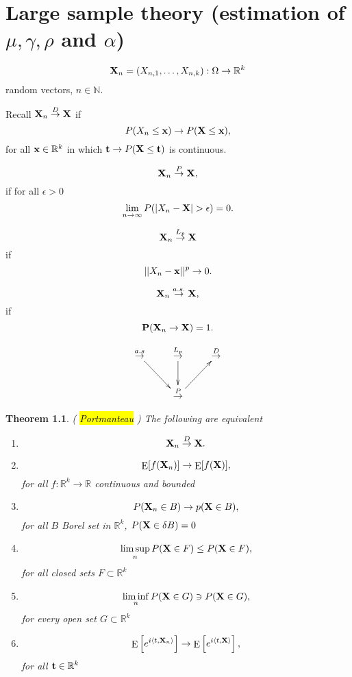 \documentclass[12pt,a4paper, notitlepage]{book}
\newcommand{\hlc}[2][yellow]{ {\sethlcolor{#1} \hl{#2}} }
\theoremstyle{definition} %
\theoremstyle{plain} %
\newtheorem{theorem}[definition]{Theorem}
\newcommand{\R}{\mathbb R}
\newcommand{\N}{\mathbb N}
\DeclareMathOperator{\E}{E}
\newcommand{\Important}[1]{ {\it \hlc{#1} } }
\begin{document}
\chapter{Large sample theory (estimation of $\mu, \gamma, \rho$ and $ \alpha$)}



\[ {\bf X} _n = (X_{n, 1}, \dots, X_{n,k}) : \Omega \rightarrow \R^k \]
 random vectors, $n \in \N . $

Recall ${\bf X}_n \overset{D}{\rightarrow}  {\bf X}$ if 
\[ P(X_n \leq {\bf x}) \rightarrow P({\bf X} \leq {\bf x}) , \]
 for all ${\bf x} \in \R^k$ in which ${\bf t} \rightarrow P({\bf X} \leq {\bf t})$ is continuous. 

\[ {\bf X}_n \overset{P}{\rightarrow}  {\bf X} , \]
 if for all $\epsilon > 0$ 
\[  \lim_{n \rightarrow \infty} P(|X_n - {\bf X}| > \epsilon) = 0. \]
 
\[ {\bf X}_n \overset{L_p}{\rightarrow} {\bf X} \]
if 
\[ ||X_n - {\bf x}||^p \rightarrow 0 . \]

\[ {\bf X}_n  \overset{a.s.}{\rightarrow} {\bf X} , \]
 if 
\[ {\bf P}({\bf X}_n \rightarrow {\bf X}) = 1 . \]

\begin{displaymath}
 \xymatrix{
  \overset{a.s}{\to} \ar[dr]   & \overset{ L_p}{\to} \ar[d] & \overset{D}{\to}  \\
 & \overset{P}{\to} \ar[ur]  &  }
\end{displaymath}


\begin{theorem} (\Important{Portmanteau})
The following are equivalent
\begin{enumerate}
\item \[ {\bf X}_n \overset{D}{\rightarrow} {\bf X} .\] 
\item \[  \E[ f({\bf X}_n)] \rightarrow \E[f({\bf X})]  , \] for all $f: \R^k \rightarrow \R$ continuous and bounded 
\item \[ P({\bf X}_n \in B) \rightarrow p({\bf X} \in B) , \] for all $B$ Borel set in $\R^k$, $P({\bf X} \in \delta B) = 0$
\item \[ \limsup_n{P({\bf X} \in F)} \leq P({\bf X} \in F) , \] for all closed sets $F \subset \R^k$
\item \[ \liminf_n{P({\bf X} \in G)} \ni P({\bf X} \in G) , \] for every open set $G \subset \R^k$
\item \[ \E \left[ e^{i \langle t, {\bf X}_n \rangle} \right]  \rightarrow \E \left[e^{i\langle t, {\bf X} \rangle} \right] , \] for all ${\bf t} \in \R^k$
\end{enumerate}
\end{theorem}
\end{document}
